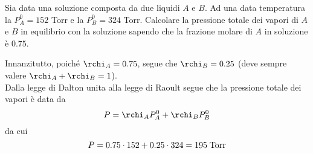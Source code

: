 \begin{esercizio}
    Sia data una soluzione composta da due liquidi $A$ e $B$. Ad una data temperatura la $P^0_A = 152$ Torr e la $P^0_B = 324$ Torr. Calcolare la pressione totale dei vapori di $A$ e $B$ in equilibrio con la soluzione sapendo che la frazione molare di $A$ in soluzione è $0.75$.
\end{esercizio}
\begin{soluzione}
    Innanzitutto, poiché $\rchi_A=0.75$, segue che $\rchi_B=0.25$ (deve sempre valere $\rchi_A + \rchi_B =1$).\\
    Dalla legge di Dalton unita alla legge di Raoult segue che la pressione totale dei vapori è data da
    \begin{equation*}
        P=\rchi_A P_A^0 + \rchi_B P_B^0
    \end{equation*}
    da cui
    \begin{equation*}
        P=0.75 \cdot 152 + 0.25 \cdot 324
        =195 \; \rm Torr
    \end{equation*}
\end{soluzione}

\newpage

